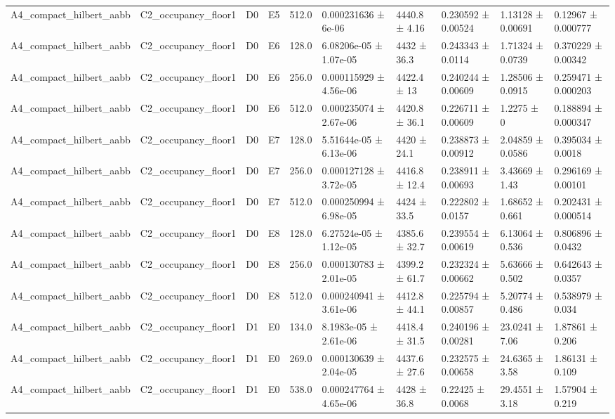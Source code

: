 \begin{table}
\begin{tabular}{llllllllll}
A4\_compact\_hilbert\_aabb & C2\_occupancy\_floor1 & D0 & E5 & 512.0 & 0.000231636 ± 6e-06 & 4440.8 ± 4.16 & 0.230592 ± 0.00524 & 1.13128 ± 0.00691 & 0.12967 ± 0.000777 \\
A4\_compact\_hilbert\_aabb & C2\_occupancy\_floor1 & D0 & E6 & 128.0 & 6.08206e-05 ± 1.07e-05 & 4432 ± 36.3 & 0.243343 ± 0.0114 & 1.71324 ± 0.0739 & 0.370229 ± 0.00342 \\
A4\_compact\_hilbert\_aabb & C2\_occupancy\_floor1 & D0 & E6 & 256.0 & 0.000115929 ± 4.56e-06 & 4422.4 ± 13 & 0.240244 ± 0.00609 & 1.28506 ± 0.0915 & 0.259471 ± 0.000203 \\
A4\_compact\_hilbert\_aabb & C2\_occupancy\_floor1 & D0 & E6 & 512.0 & 0.000235074 ± 2.67e-06 & 4420.8 ± 36.1 & 0.226711 ± 0.00609 & 1.2275 ± 0 & 0.188894 ± 0.000347 \\
A4\_compact\_hilbert\_aabb & C2\_occupancy\_floor1 & D0 & E7 & 128.0 & 5.51644e-05 ± 6.13e-06 & 4420 ± 24.1 & 0.238873 ± 0.00912 & 2.04859 ± 0.0586 & 0.395034 ± 0.0018 \\
A4\_compact\_hilbert\_aabb & C2\_occupancy\_floor1 & D0 & E7 & 256.0 & 0.000127128 ± 3.72e-05 & 4416.8 ± 12.4 & 0.238911 ± 0.00693 & 3.43669 ± 1.43 & 0.296169 ± 0.00101 \\
A4\_compact\_hilbert\_aabb & C2\_occupancy\_floor1 & D0 & E7 & 512.0 & 0.000250994 ± 6.98e-05 & 4424 ± 33.5 & 0.222802 ± 0.0157 & 1.68652 ± 0.661 & 0.202431 ± 0.000514 \\
A4\_compact\_hilbert\_aabb & C2\_occupancy\_floor1 & D0 & E8 & 128.0 & 6.27524e-05 ± 1.12e-05 & 4385.6 ± 32.7 & 0.239554 ± 0.00619 & 6.13064 ± 0.536 & 0.806896 ± 0.0432 \\
A4\_compact\_hilbert\_aabb & C2\_occupancy\_floor1 & D0 & E8 & 256.0 & 0.000130783 ± 2.01e-05 & 4399.2 ± 61.7 & 0.232324 ± 0.00662 & 5.63666 ± 0.502 & 0.642643 ± 0.0357 \\
A4\_compact\_hilbert\_aabb & C2\_occupancy\_floor1 & D0 & E8 & 512.0 & 0.000240941 ± 3.61e-06 & 4412.8 ± 44.1 & 0.225794 ± 0.00857 & 5.20774 ± 0.486 & 0.538979 ± 0.034 \\
A4\_compact\_hilbert\_aabb & C2\_occupancy\_floor1 & D1 & E0 & 134.0 & 8.1983e-05 ± 2.61e-06 & 4418.4 ± 31.5 & 0.240196 ± 0.00281 & 23.0241 ± 7.06 & 1.87861 ± 0.206 \\
A4\_compact\_hilbert\_aabb & C2\_occupancy\_floor1 & D1 & E0 & 269.0 & 0.000130639 ± 2.04e-05 & 4437.6 ± 27.6 & 0.232575 ± 0.00658 & 24.6365 ± 3.58 & 1.86131 ± 0.109 \\
A4\_compact\_hilbert\_aabb & C2\_occupancy\_floor1 & D1 & E0 & 538.0 & 0.000247764 ± 4.65e-06 & 4428 ± 36.8 & 0.22425 ± 0.0068 & 29.4551 ± 3.18 & 1.57904 ± 0.219 \\

\end{tabular}
\end{table}
